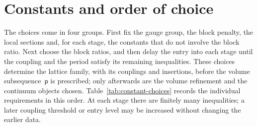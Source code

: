 
\section{Constants and order of choice}\label{sec:constants}

The choices come in four groups. First fix the gauge group, the block penalty, the local sections and, for each stage, the constants that do not involve the block ratio. Next choose the block ratios, and then delay the entry into each stage until the coupling and the period satisfy its remaining inequalities. These choices determine the lattice family, with its couplings and insertions, before the volume subsequence~$\mathsf p$ is prescribed; only afterwards are the volume refinement and the continuum objects chosen. Table~\ref{tab:constant-choices} records the individual requirements in this order. At each stage there are finitely many inequalities; a later coupling threshold or entry level may be increased without changing the earlier data.


